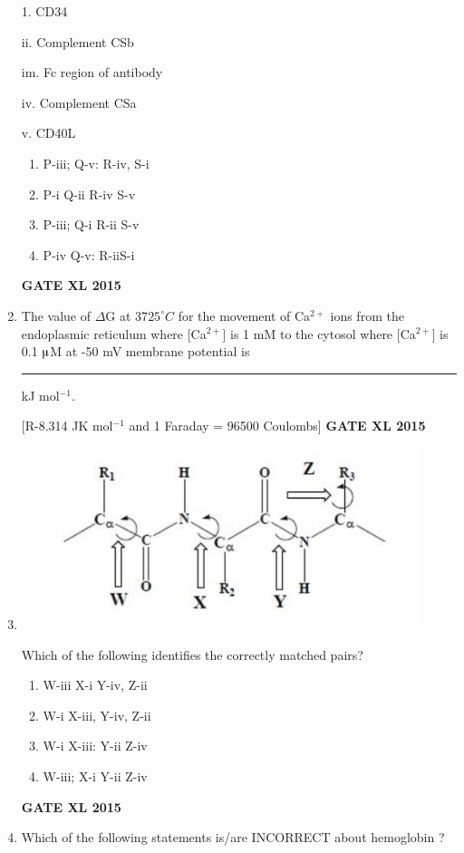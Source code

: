 \documentclass[journal,12pt,onecolumn]{IEEEtran}
\begin{document}
\begin{enumerate}
\begin{minipage}{0.5\textwidth}
\begin{flushleft}
1. CD34

ii. Complement CSb

im. Fc region of antibody

iv. Complement CSa

v. CD40L
		\end{flushleft}
	\end{minipage}

        \begin{enumerate} 
            \item P-iii; Q-v: R-iv, S-i
	    \item P-i Q-ii R-iv S-v
	    \item P-iii; Q-i R-ii S-v
            \item P-iv Q-v: R-iiS-i
	\end{enumerate}
\hfill{\textbf{GATE XL 2015}}
\item The value of $\Delta$G at 37$25^{\circ}C$ for the movement of Ca$^{2+}$ ions from the endoplasmic reticulum where [Ca$^{2+}$] is 1 mM to the cytosol where [Ca$^{2+}$] is 0.1 $\micro$M at -50 mV membrane potential is\rule{1cm}{0.15mm} kJ mol$^{-1}$.

	[R-8.314 JK mol$^{-1}$ and 1 Faraday = 96500 Coulombs]
\hfill{\textbf{GATE XL 2015}}
\item 

	\begin{figure}[h!]
		\centering
    \includegraphics{41}
		    \caption*{}
		\label{fig:Q41}
	\end{figure}

Which of the following identifies the correctly matched pairs?
        \begin{enumerate} 
            \item W-iii X-i Y-iv, Z-ii
	    \item W-i X-iii, Y-iv, Z-ii
	    \item W-i X-iii: Y-ii Z-iv
            \item W-iii; X-i Y-ii Z-iv
	\end{enumerate}
\hfill{\textbf{GATE XL 2015}}
\item Which of the following statements is/are INCORRECT about hemoglobin ?


\end{enumerate}
\end{document}
